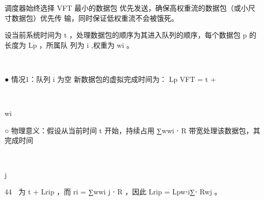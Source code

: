 调度器始终选择 VFT 最小的数据包 优先发送，确保高权重流的数据包（或小尺寸数据包）优先传
输，同时保证低权重流不会被饿死。

设当前系统时间为 t ，处理数据包的顺序为其进入队列的顺序，每个数据包 p 的长度为 Lp ，所属队
列为 i ,权重为 wi 。
                                                                             ​




                            ​




 ● 情况1：队列 i 为空
   新数据包的虚拟完成时间为：
                            Lp
     VFT = t +
                                     ​




                                         ​




                            wi   ​




     ○       物理意义：假设从当前时间 t 开始，持续占用 ∑wwi ⋅ R 带宽处理该数据包，其完成时间
                                                     ​




                                                                 ​




                                                         j   ​




                                                                                 44
         为 t + Lrip ，而 ri = ∑wwi j ⋅ R ，因此 Lrip = Lpw⋅i∑⋅ Rwj 。
                 ​
                     ​




                         ​           ​
                                                          ​




                                                              ​




                                                                                                  ​
                                                                                                          ​




                                                                                                              ​
                                                                                                                                      ​




